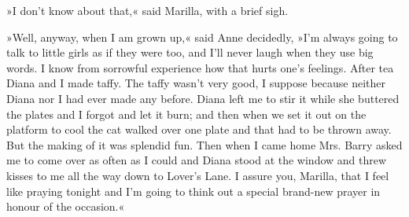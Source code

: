 »I don’t know about that,« said Marilla, with a brief sigh.

»Well, anyway, when I am grown up,« said Anne decidedly, »I’m always going to talk to little girls as if they were too, and I’ll never laugh when they use big words. I know from sorrowful experience how that hurts one’s feelings. After tea Diana and I made taffy. The taffy wasn’t very good, I suppose because neither Diana nor I had ever made any before. Diana left me to stir it while she buttered the plates and I forgot and let it burn; and then when we set it out on the platform to cool the cat walked over one plate and that had to be thrown away. But the making of it was splendid fun. Then when I came home Mrs. Barry asked me to come over as often as I could and Diana stood at the window and threw kisses to me all the way down to Lover’s Lane. I assure you, Marilla, that I feel like praying tonight and I’m going to think out a special brand-new prayer in honour of the occasion.«